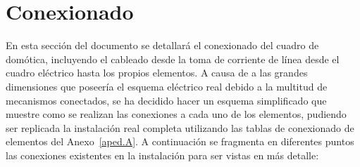 \section{Conexionado}
En esta sección del documento se detallará el conexionado del cuadro de domótica, incluyendo el cableado desde la toma de corriente de línea desde el cuadro eléctrico hasta los propios elementos. A causa de a las grandes dimensiones que poseería el esquema eléctrico real debido a la multitud de mecanismos conectados, se ha decidido hacer un esquema simplificado que muestre como se realizan las conexiones a cada uno de los elementos, pudiendo ser replicada la instalación real completa utilizando las tablas de conexionado de elementos del Anexo~\ref{aped.A}. A continuación se fragmenta en diferentes puntos las conexiones existentes en la instalación para ser vistas en más detalle:
